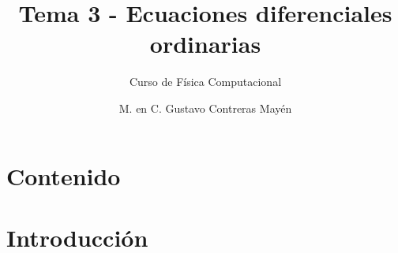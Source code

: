 
\title{Tema 3 - Ecuaciones diferenciales ordinarias}
\subtitle{Curso de Física Computacional}
\author[]{M. en C. Gustavo Contreras Mayén}

\maketitle
\fontsize{14}{14}\selectfont
{}
\section*{Contenido}
\section{Introducción}
